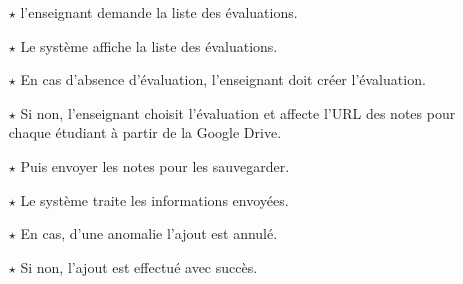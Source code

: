 \begin{itemize}	
	
	
	
	\item[$\star$]  l'enseignant demande la liste des évaluations.
	\item[$\star$] Le système affiche la liste des évaluations.
	\item[$\star$] En cas d’absence d’évaluation, l'enseignant doit créer l’évaluation.
	\item[$\star$] Si non, l'enseignant choisit l’évaluation et affecte l'URL des notes pour chaque  étudiant  à partir de la Google Drive.
	\item[$\star$] Puis envoyer les notes pour les sauvegarder.
	\item[$\star$] Le système traite les informations envoyées.
	\item[$\star$] En cas, d’une anomalie l’ajout est annulé.
	\item[$\star$] Si non, l’ajout est effectué avec succès.
	
	
	


\end{itemize}
